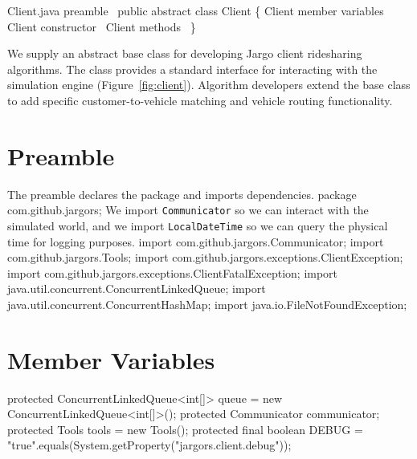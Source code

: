 \nwenddocs{}\endmoddef{}
\LA{}Client.java preamble~{\nwtagstyle{}}\RA{}
public abstract class Client \{
  \LA{}\code{}Client\edoc{} member variables~{\nwtagstyle{}}\RA{}
  \LA{}\code{}Client\edoc{} constructor~{\nwtagstyle{}}\RA{}
  \LA{}\code{}Client\edoc{} methods~{\nwtagstyle{}}\RA{}
\}
\nwendcode{}\nwdocspar

We supply an abstract base class for developing Jargo client ridesharing
algorithms. The class provides a standard interface for interacting with the
simulation engine (Figure~\ref{fig:client}). Algorithm developers extend the
base class to add specific customer-to-vehicle matching and vehicle routing
functionality.

\section{Preamble}
The preamble declares the package and imports dependencies.
\nwenddocs{}\endmoddef{}
package com.github.jargors;
\nwendcode{}\nwdocspar
We import {\tt{}Communicator} so we can interact with the simulated world,
and we import {\tt{}LocalDateTime} so we can query the physical time for
logging purposes.
\nwenddocs{}\plusendmoddef
import com.github.jargors.Communicator;
import com.github.jargors.Tools;
import com.github.jargors.exceptions.ClientException;
import com.github.jargors.exceptions.ClientFatalException;
import java.util.concurrent.ConcurrentLinkedQueue;
import java.util.concurrent.ConcurrentHashMap;
import java.io.FileNotFoundException;
\nwendcode{}\nwdocspar

\section{Member Variables}
\nwenddocs{}\endmoddef{}
protected ConcurrentLinkedQueue<int[]> queue = new ConcurrentLinkedQueue<int[]>();
protected Communicator communicator;
protected Tools tools = new Tools();
protected final boolean DEBUG =
    "true".equals(System.getProperty("jargors.client.debug"));
\nwendcode{}\nwdocspar

